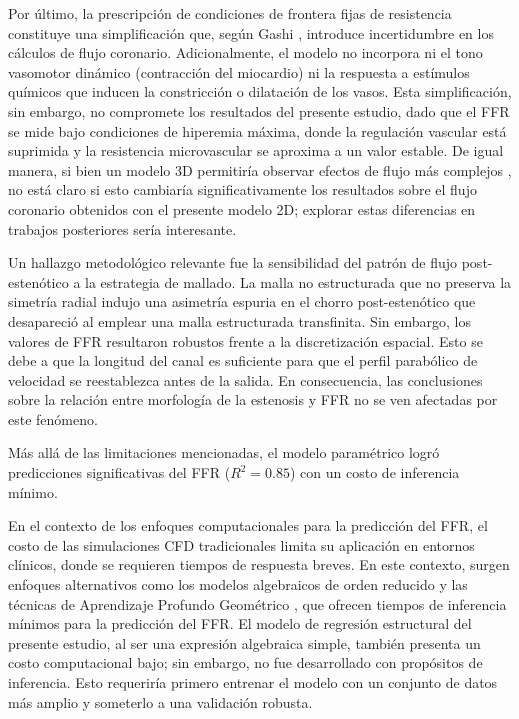 \documentclass[12pt, letterpaper]{article}
\begin{document}
Por último, la prescripción de condiciones de frontera fijas de resistencia constituye una simplificación que, según Gashi \cite{Gashi2019Impact}, introduce incertidumbre en los cálculos de flujo coronario. Adicionalmente, el modelo no incorpora ni el tono vasomotor dinámico (contracción del miocardio) ni la respuesta a estímulos químicos \cite{Huo2009Effect} que inducen la constricción o dilatación de los vasos. Esta simplificación, sin embargo, no compromete los resultados del presente estudio, dado que el FFR se mide bajo condiciones de hiperemia máxima, donde la regulación vascular está suprimida y la resistencia microvascular se aproxima a un valor estable. De igual manera, si bien un modelo 3D permitiría observar efectos de flujo más complejos \cite{ku_blood_1997}, no está claro si esto cambiaría significativamente los resultados sobre el flujo coronario obtenidos con el presente modelo 2D; explorar estas diferencias en trabajos posteriores sería interesante.

Un hallazgo metodológico relevante fue la sensibilidad del patrón de flujo post-estenótico a la estrategia de mallado. La malla no estructurada que no preserva la simetría radial indujo una asimetría espuria en el chorro post-estenótico que desapareció al emplear una malla estructurada transfinita. Sin embargo, los valores de FFR resultaron robustos frente a la discretización espacial. Esto se debe a que la longitud del canal es suficiente para que el perfil parabólico de velocidad se reestablezca antes de la salida. En consecuencia, las conclusiones sobre la relación entre morfología de la estenosis y FFR no se ven afectadas por este fenómeno.

Más allá de las limitaciones mencionadas, el modelo paramétrico logró predicciones significativas del FFR ($R^2 = 0.85$) con un costo de inferencia mínimo.

En el contexto de los enfoques computacionales para la predicción del FFR, el costo de las simulaciones CFD tradicionales limita su aplicación en entornos clínicos, donde se requieren tiempos de respuesta breves. En este contexto, surgen enfoques alternativos como los modelos algebraicos de orden reducido \cite{Fayssal2021Fast} y las técnicas de Aprendizaje Profundo Geométrico \cite{Suk2025Cardiovascular}, que ofrecen tiempos de inferencia mínimos para la predicción del FFR. El modelo de regresión estructural del presente estudio, al ser una expresión algebraica simple, también presenta un costo computacional bajo; sin embargo, no fue desarrollado con propósitos de inferencia. Esto requeriría primero entrenar el modelo con un conjunto de datos más amplio y someterlo a una validación robusta.
\end{document}
